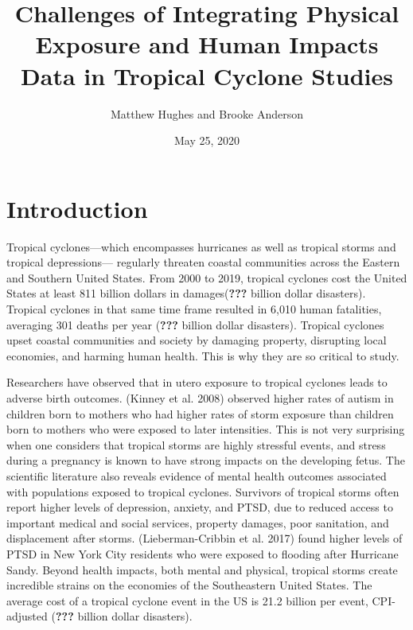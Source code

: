 \documentclass[]{article}
\title{Challenges of Integrating Physical Exposure and Human Impacts Data in
Tropical Cyclone Studies}
\author{Matthew Hughes and Brooke Anderson}
\date{May 25, 2020}
\begin{document}
\maketitle

\section{Introduction}\label{introduction}

Tropical cyclones---which encompasses hurricanes as well as tropical
storms and tropical depressions--- regularly threaten coastal
communities across the Eastern and Southern United States. From 2000 to
2019, tropical cyclones cost the United States at least 811 billion
dollars in damages({\textbf{???}} billion dollar disasters). Tropical
cyclones in that same time frame resulted in 6,010 human fatalities,
averaging 301 deaths per year ({\textbf{???}} billion dollar disasters).
Tropical cyclones upset coastal communities and society by damaging
property, disrupting local economies, and harming human health. This is
why they are so critical to study.

Researchers have observed that in utero exposure to tropical cyclones
leads to adverse birth outcomes. (Kinney et al. 2008) observed higher
rates of autism in children born to mothers who had higher rates of
storm exposure than children born to mothers who were exposed to later
intensities. This is not very surprising when one considers that
tropical storms are highly stressful events, and stress during a
pregnancy is known to have strong impacts on the developing fetus. The
scientific literature also reveals evidence of mental health outcomes
associated with populations exposed to tropical cyclones. Survivors of
tropical storms often report higher levels of depression, anxiety, and
PTSD, due to reduced access to important medical and social services,
property damages, poor sanitation, and displacement after storms.
(Lieberman-Cribbin et al. 2017) found higher levels of PTSD in New York
City residents who were exposed to flooding after Hurricane Sandy.
Beyond health impacts, both mental and physical, tropical storms create
incredible strains on the economies of the Southeastern United States.
The average cost of a tropical cyclone event in the US is 21.2 billion
per event, CPI-adjusted ({\textbf{???}} billion dollar disasters).
\end{document}
